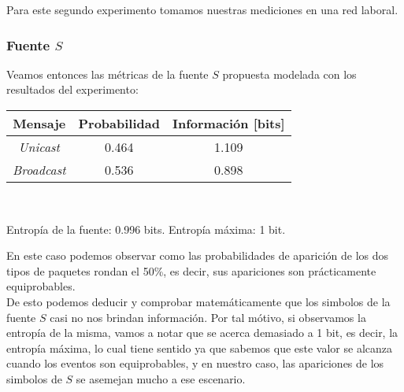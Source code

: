 \par Para este segundo experimento tomamos nuestras mediciones en una red laboral.

\subsubsection{Fuente $S$}

\par Veamos entonces las m\'etricas de la fuente $S$ propuesta modelada con los resultados del experimento: \\

\begin{tabular}{ | c | c | c |}
    \hline
    Mensaje & Probabilidad & Información [bits] \\
    \hline
    \textit{Unicast} & 0.464 & 1.109 \\
    \hline
    \textit{Broadcast} & 0.536 & 0.898 \\
    \hline
\end{tabular} \\

\par Entropía de la fuente: 0.996 bits. Entropía máxima: 1 bit.

\par En este caso podemos observar como las probabilidades de aparici\'on de los dos tipos de paquetes rondan el 50\%, es decir, sus apariciones son pr\'acticamente equiprobables. \\
De esto podemos deducir y comprobar matem\'aticamente que los simbolos de la fuente $S$ casi no nos brindan informaci\'on. Por tal m\'otivo, si observamos la entrop\'ia de la misma, vamos a notar que se acerca demasiado a 1 bit, es decir, la entrop\'ia m\'axima, lo cual tiene sentido ya que sabemos que este valor se alcanza cuando los eventos son equiprobables, y en nuestro caso, las apariciones de los simbolos de $S$ se asemejan mucho a ese escenario.